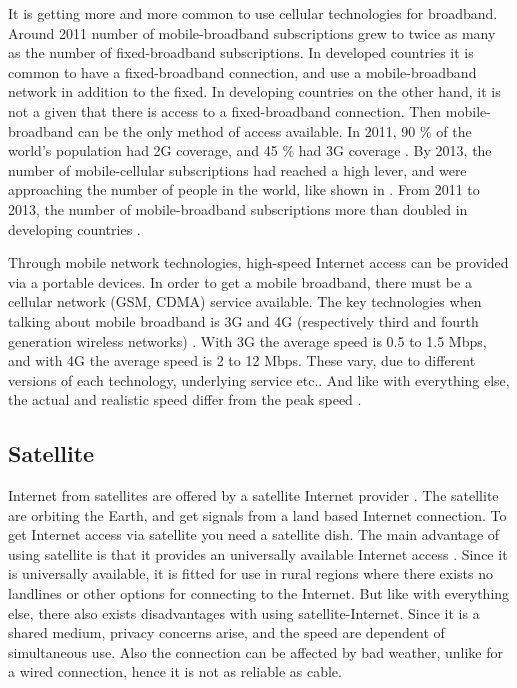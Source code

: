 It is getting more and more common to use cellular technologies for broadband. Around 2011 number of mobile-broadband subscriptions grew to twice as many as the number of fixed-broadband subscriptions. In developed countries it is common to have a fixed-broadband connection, and use a mobile-broadband network in addition to the fixed. In developing countries on the other hand, it is not a given that there is access to a fixed-broadband connection. Then mobile-broadband can be the only method of access available. In 2011, 90 \% of the world's population had 2G coverage, and 45 \% had 3G coverage \cite{itu2011}. By 2013, the number of mobile-cellular subscriptions had reached a high lever, and were approaching the number of people in the world, like shown in . From 2011 to 2013, the number of mobile-broadband  subscriptions more than doubled in developing countries \cite{itu2013}. 

Through mobile network technologies, high-speed Internet access can be provided via a portable devices. In order to get a mobile broadband, there must be a cellular network (GSM, CDMA) service available. The key technologies when talking about mobile broadband is 3G and 4G (respectively third and fourth generation wireless networks) \cite{mobilebroadband}. With 3G the average speed is 0.5 to 1.5 Mbps, and with 4G the average speed is 2 to 12 Mbps. These vary, due to different versions of each technology, underlying service etc.. And like with everything else, the actual and realistic speed differ from the peak speed \cite{3gvs4g}. 


\subsection{Satellite}
Internet from satellites are offered by a satellite Internet provider \cite{cablevssatellite}. The satellite are orbiting the Earth, and get signals from a land based Internet connection. To get Internet access via satellite you need a satellite dish. The main advantage of using satellite is that it provides an universally available Internet access \cite{broadband}. Since it is universally available, it is fitted for use in rural regions where there exists no landlines or other options for connecting to the Internet. But like with everything else, there also exists disadvantages with using satellite-Internet. Since it is a shared medium, privacy concerns arise, and the speed are dependent of simultaneous use. Also the connection can be affected by bad weather, unlike for a wired connection, hence it is not as reliable as cable. 

